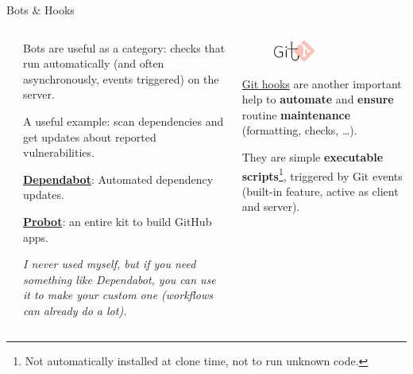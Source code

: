 \documentclass[9pt]{beamer}
\begin{document}
\begin{frame}{Bots \& Hooks}
    \vspace*{20pt}
    \begin{columns}
        \begin{column}{0.05\textwidth}
        \end{column}
        \begin{column}{0.45\textwidth}
            Bots are useful as a category: checks that run automatically (and
            often asynchronously, events triggered) on the server.
            \vspace*{15pt}

            A useful example: scan dependencies and get updates about reported
            vulnerabilities.
            \vspace*{5pt}

            \href{https://github.com/dependabot}{\textbf{Dependabot}}:
            Automated
            dependency updates.

            \href{https://probot.github.io/}{\textbf{Probot}}: an entire kit to
            build GitHub apps.
            \vspace*{5pt}

            {\itshape\small
                I never used myself, but if you need something like Dependabot,
                you can use it to make your custom one (workflows can already
                do a lot).
            }
        \end{column}
        \begin{column}{0.45\textwidth}
            \begin{figure}
                \centering
                \includegraphics[width=0.4\textwidth]{hooks}
            \end{figure}
            \href{https://git-scm.com/book/en/v2/Customizing-Git-Git-Hooks}{Git
            hooks} are another important help to \textbf{automate} and
            \textbf{ensure} routine \textbf{maintenance} (formatting, checks,
            \dots).\newline

            They are simple \textbf{executable scripts}\footnote{
                Not automatically installed at clone time, not to run unknown
                code.
            }, triggered by Git events (built-in feature, active as client and
            server).
            \vspace*{10pt}


\end{column}
\end{columns}
\end{frame}
\end{document}
